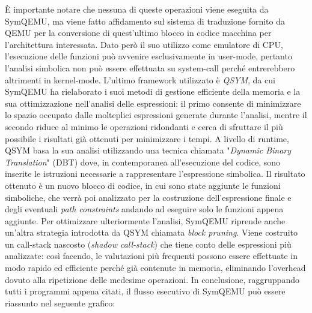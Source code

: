 \documentclass[Lau, oneside]{sapthesis}%
\begin{document}
\newpage
È importante notare che nessuna di queste operazioni viene eseguita da SymQEMU, ma viene fatto affidamento sul sistema di traduzione fornito da QEMU per la conversione di quest'ultimo blocco in codice macchina per l'architettura interessata.
\newline
Dato però il suo utilizzo come emulatore di CPU, l'esecuzione delle funzioni può avvenire esclusivamente in user-mode, pertanto l'analisi simbolica non può essere effettuata su system-call perché entrerebbero altrimenti in kernel-mode.
\newline \newline \newline
L'ultimo framework utilizzato è \textit{QSYM}, da cui SymQEMU ha rielaborato i suoi metodi di gestione efficiente della memoria e la sua ottimizzazione nell'analisi delle espressioni: il primo consente di minimizzare lo spazio occupato dalle molteplici espressioni generate durante l'analisi, mentre il secondo riduce al minimo le operazioni ridondanti e cerca di sfruttare il più possibile i risultati già ottenuti per minimizzare i tempi.
\newline \newline
A livello di runtime, QSYM basa la sua analisi utilizzando una tecnica chiamata "\textit{Dynamic Binary Translation}" (DBT) dove, in contemporanea all'esecuzione del codice, sono inserite le istruzioni necessarie a rappresentare l'espressione simbolica.
\newline
Il risultato ottenuto è un nuovo blocco di codice, in cui sono state aggiunte le funzioni simboliche, che verrà poi analizzato per la costruzione dell'espressione finale e degli eventuali \textit{path constraints} andando ad eseguire solo le funzioni appena aggiunte.
\newline \newline
Per ottimizzare ulteriormente l'analisi, SymQEMU riprende anche un'altra strategia introdotta da QSYM chiamata \textit{block pruning}.
\newline
Viene costruito un call-stack nascosto (\textit{shadow call-stack}) che tiene conto delle espressioni più analizzate: così facendo, le valutazioni più frequenti possono essere effettuate in modo rapido ed efficiente perché già contenute in memoria, eliminando l'overhead dovuto alla ripetizione delle medesime operazioni.
\newline \newline \newline
In conclusione, raggruppando tutti i programmi appena citati, il flusso esecutivo di SymQEMU può essere riassunto nel seguente grafico:
\end{document}
